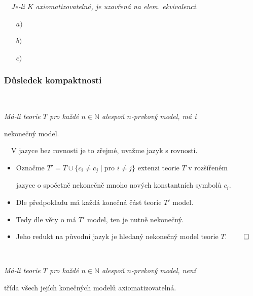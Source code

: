 {\bf {}}\ \ {\it Je-li $K$ axiomatizovatelná, je uzavřená na elem. ekvivalenci.}
\medskip

\begin{enumerate}
\item[$a)$] 
\smallskip

\item[$b)$] 
\smallskip

\item[$c)$] 
\end{enumerate}



\subsubsection*{Důsledek kompaktnosti}

{\bf {}}\ \ {\it Má-li teorie $T$ pro každé $n\in \mathbb{N}$ alespoň $n$-prvkový model, má i
\smallskip

nekonečný model.}
\medskip

{\it {}}\ \ V jazyce bez rovnosti je to zřejmé, uvažme jazyk s rovností.

\begin{itemize}
\item Označme $T'=T \cup \{c_i \ne c_j \mid \text{pro }i\ne j\}$ extenzi teorie $T$ v rozšířeném
\smallskip

jazyce o spočetně nekonečně mnoho nových konstantních symbolů $c_i$.
\smallskip

\item Dle předpokladu má každá konečná část teorie $T'$ model.
\smallskip

\item Tedy dle věty o  má $T'$ model, ten je nutně nekonečný.
\smallskip

\item Jeho redukt na původní jazyk je hledaný nekonečný model teorie $T$. $\qed$
\end{itemize}
\medskip

{\bf {}}\ \ {\it Má-li teorie $T$ pro každé $n\in \mathbb{N}$ alespoň $n$-prvkový model, není
\smallskip

třída všech jejích konečných modelů axiomatizovatelná.}
\bigskip

